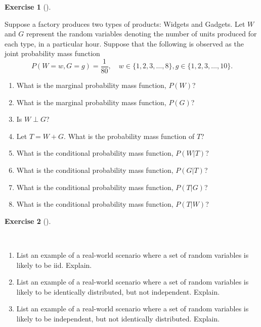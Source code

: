 \documentclass[
  letterpaper,
  DIV=11,
  numbers=noendperiod]{scrreprt}
\providecommand{\tightlist}{%
  \setlength{\itemsep}{0pt}\setlength{\parskip}{0pt}}\usepackage{longtable,booktabs,array}
\theoremstyle{definition}
\newtheorem{exercise}{Exercise}[chapter]
\theoremstyle{definition}
\theoremstyle{definition}
\theoremstyle{remark}
\begin{document}
\begin{exercise}[]\protect\hypertarget{exr-5.13}{}\label{exr-5.13}

Suppose a factory produces two types of products: Widgets and Gadgets.
Let \(W\) and \(G\) represent the random variables denoting the number
of units produced for each type, in a particular hour. Suppose that the
following is observed as the joint probability mass function
\[P(W=w, G=g) = \frac{1}{80}, \quad w \in \{1,2,3,\dots,8\}, g \in \{1,2,3,\dots,10\}.\]

\begin{enumerate}
\def\labelenumi{\alph{enumi}.}
\tightlist
\item
  What is the marginal probability mass function, \(P(W)\)?
\item
  What is the marginal probability mass function, \(P(G)\)?
\item
  Is \(W\perp G\)?
\item
  Let \(T = W + G\). What is the probability mass function of \(T\)?
\item
  What is the conditional probability mass function, \(P(W|T)\)?
\item
  What is the conditional probability mass function, \(P(G|T)\)?
\item
  What is the conditional probability mass function, \(P(T|G)\)?
\item
  What is the conditional probability mass function, \(P(T|W)\)?
\end{enumerate}

\end{exercise}

\begin{exercise}[]\protect\hypertarget{exr-5.14}{}\label{exr-5.14}

~

\begin{enumerate}
\def\labelenumi{\alph{enumi}.}
\tightlist
\item
  List an example of a real-world scenario where a set of random
  variables is likely to be iid. Explain.
\item
  List an example of a real-world scenario where a set of random
  variables is likely to be identically distributed, but not
  independent. Explain.
\item
  List an example of a real-world scenario where a set of random
  variables is likely to be independent, but not identically
  distributed. Explain.
\end{enumerate}

\end{exercise}
\end{document}
